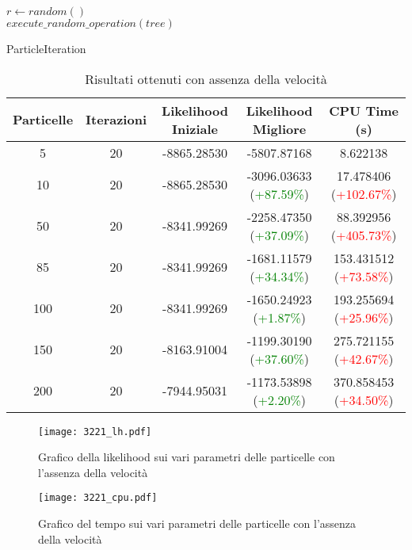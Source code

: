 \begin{algorithm}[!h]
    $r \gets random()$ \\
    $execute\_random\_operation(tree)$
    \caption{ParticleIteration}
    \label{algo:pso-adapt-calculate-1}
\end{algorithm}
\begin{table}[!h]
  \centering
  \begin{tabular}{*{5}{c}}
    Particelle & Iterazioni & Likelihood Iniziale & Likelihood Migliore & CPU Time (s) \\ \midrule \midrule
    5 & 20 & -8865.28530 & -5807.87168 & 8.622138 \\
    10 & 20 & -8865.28530 & -3096.03633 (\textcolor{green}{+87.59\%}) & 17.478406 (\textcolor{red}{+102.67\%})\\
    50 & 20 & -8341.99269 & -2258.47350 (\textcolor{green}{+37.09\%}) & 88.392956 (\textcolor{red}{+405.73\%}) \\
    85 & 20 & -8341.99269 & -1681.11579 (\textcolor{green}{+34.34\%}) & 153.431512 (\textcolor{red}{+73.58\%}) \\
    100 & 20 & -8341.99269 & -1650.24923 (\textcolor{green}{+1.87\%}) & 193.255694 (\textcolor{red}{+25.96\%}) \\
    150 & 20 & -8163.91004 & -1199.30190 (\textcolor{green}{+37.60\%}) & 275.721155 (\textcolor{red}{+42.67\%}) \\
    200 & 20 & -7944.95031 & -1173.53898 (\textcolor{green}{+2.20\%}) & 370.858453 (\textcolor{red}{+34.50\%})
  \end{tabular}
  \caption{Risultati ottenuti con assenza della velocità}
  \label{tab:pso-adapt-calculate-1-table}
\end{table}
\begin{figure}[!h]
  \centering
  \begin{minipage}{.45 \textwidth}
  \centering
  \texttt{[image: 3221\_lh.pdf]}
  \caption{Grafico della likelihood sui vari parametri delle particelle con l'assenza della velocità}
  \end{minipage}
  \begin{minipage}{.45 \textwidth}
    \centering
    \texttt{[image: 3221\_cpu.pdf]}
    \caption{Grafico del tempo sui vari parametri delle particelle con l'assenza della velocità}
  \end{minipage}
  \label{fig:pso-adapt-calculate-1-graph}
\end{figure}
